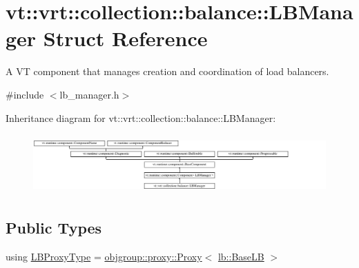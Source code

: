 \hypertarget{structvt_1_1vrt_1_1collection_1_1balance_1_1_l_b_manager}{}\section{vt\+:\+:vrt\+:\+:collection\+:\+:balance\+:\+:L\+B\+Manager Struct Reference}
\label{structvt_1_1vrt_1_1collection_1_1balance_1_1_l_b_manager}


A VT component that manages creation and coordination of load balancers.  




{\ttfamily \#include $<$lb\+\_\+manager.\+h$>$}

Inheritance diagram for vt\+:\+:vrt\+:\+:collection\+:\+:balance\+:\+:L\+B\+Manager\+:\begin{figure}[H]
\begin{center}
\leavevmode
\includegraphics[height=2.310231cm]{structvt_1_1vrt_1_1collection_1_1balance_1_1_l_b_manager}
\end{center}
\end{figure}
\subsection*{Public Types}
\begin{DoxyCompactItemize}
\item 
using \hyperlink{structvt_1_1vrt_1_1collection_1_1balance_1_1_l_b_manager_a8b1a7735366beb85c2c2ccc3912cdd80}{L\+B\+Proxy\+Type} = \hyperlink{structvt_1_1objgroup_1_1proxy_1_1_proxy}{objgroup\+::proxy\+::\+Proxy}$<$ \hyperlink{structvt_1_1vrt_1_1collection_1_1lb_1_1_base_l_b}{lb\+::\+Base\+LB} $>$
\end{DoxyCompactItemize}

